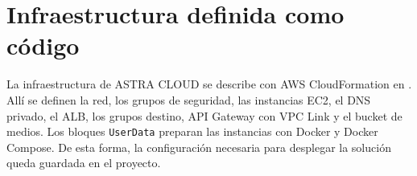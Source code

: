 ﻿\chapter{Infraestructura definida como código}
La infraestructura de ASTRA CLOUD se describe con AWS CloudFormation en . Allí se definen la red, los grupos de seguridad, las instancias EC2, el DNS privado, el ALB, los grupos destino, API Gateway con VPC Link y el bucket de medios. Los bloques \texttt{UserData} preparan las instancias con Docker y Docker Compose. De esta forma, la configuración necesaria para desplegar la solución queda guardada en el proyecto.
